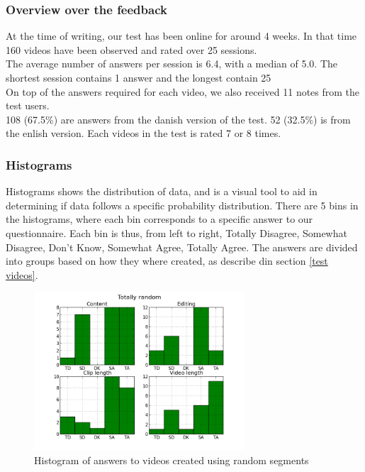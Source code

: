\subsubsection{Overview over the feedback}
%
At the time of writing, our test has been online for around 4 weeks. In that time 160 videos have been observed and rated over 25 sessions.\\
The average number of answers per session is 6.4, with a median of 5.0. The shortest session contains 1 answer and the longest contain 25\\
On top of the answers required for each video, we also received 11 notes from the test users.\\
108 (67.5\%) are answers from the danish version of the test. 52 (32.5\%) is from the enlish version. Each videos in the test is rated 7 or 8 times.
%
\subsubsection{Histograms}\label{sec:histograms}
%
Histograms shows the distribution of data, and is a visual tool to aid in determining if data follows a specific probability distribution. There are 5 bins in the histograms, where each bin corresponds to a specific answer to our questionnaire. Each bin is thus, from left to right, Totally Disagree, Somewhat Disagree, Don't Know, Somewhat Agree, Totally Agree. The answers are divided into groups based on how they where created, as describe din section \ref{test videos}.
%
\begin{figure}[!ht]
     \centering
     \includegraphics[width=0.7\textwidth]{img/totallyrandom_barplot.png}
     \caption{Histogram of answers to videos created using random segments}\label{fig:hist_random}
\end{figure}
%
